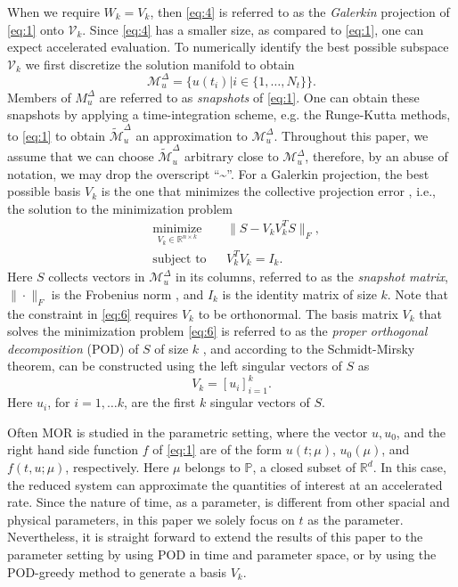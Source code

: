 When we require $W_k=V_k$, then \eqref{eq:4} is referred to as the \emph{Galerkin} projection of \eqref{eq:1} onto $\mathcal V_k$. Since \eqref{eq:4} has a smaller size, as compared to \eqref{eq:1}, one can expect accelerated evaluation. To numerically identify the best possible subspace $\mathcal V_{k}$ we first discretize the solution manifold to obtain
\begin{equation} \label{eq:5}
	\mathcal M_{u}^{\Delta} = \{ u(t_i) | i\in \{ 1,\dots,N_t \} \}.
\end{equation}
Members of $M_{u}^{\Delta}$ are referred to as \emph{snapshots} of \eqref{eq:1}. One can obtain these snapshots by applying a time-integration scheme, e.g. the Runge-Kutta methods, to \eqref{eq:1} to obtain $\tilde {\mathcal M}_{u}^{\Delta}$ an approximation to $\mathcal M_{u}^{\Delta}$. Throughout this paper, we assume that we can choose $\tilde{\mathcal M}_{u}^{\Delta}$ arbitrary close to $\mathcal M_{u}^{\Delta}$, therefore, by an abuse of notation, we may drop the overscript ``\textasciitilde''. For a Galerkin projection, the best possible basis $V_k$ is the one that minimizes the collective projection error \cite{hesthaven2015certified}, i.e., the solution to the minimization problem
\begin{equation} \label{eq:6}
\begin{aligned}
&  \underset{V_k\in\mathbb R^{n\times k}}{\text{minimize}}
& &  \| S - V_kV_k^TS\|_F, \\
& \text{subject to}
& & V_k^TV_k=I_k.
\end{aligned}
\end{equation}
Here $S$ collects vectors in $\mathcal M_{u}^{\Delta}$ in its columns, referred to as the \emph{snapshot matrix}, $\|\cdot \|_F$ is the Frobenius norm \cite{trefethen97}, and $I_{k}$ is the identity matrix of size $k$. Note that the constraint in \eqref{eq:6} requires $V_k$ to be orthonormal. The basis matrix $V_k$ that solves the minimization problem \eqref{eq:6} is referred to as the \emph{proper orthogonal decomposition} (POD) of $S$ of size $k$ \cite{hesthaven2015certified}, and according to the Schmidt-Mirsky theorem, can be constructed using the left singular vectors of $S$ as
\begin{equation}
	V_{k} = [u_i]_{i=1}^{k}.
\end{equation}
Here $u_i$, for $i=1,\dots k$, are the first $k$ singular vectors of $S$.

Often MOR is studied in the parametric setting, where the vector $u,u_0$, and the right hand side function $f$ of \eqref{eq:1} are of the form $u(t;\mu)$, $u_0(\mu)$, and $f(t,u;\mu)$, respectively. Here $\mu$ belongs to $\mathbb P$, a closed subset of $\mathbb R^d$. In this case, the reduced system can approximate the quantities of interest at an accelerated rate. Since the nature of time, as a parameter, is different from other spacial and physical parameters, in this paper we solely focus on $t$ as the parameter. Nevertheless, it is straight forward to extend the results of this paper to the parameter setting by using POD in time and parameter space, or by using the POD-greedy \cite{haasdonk2013convergence,hesthaven2015certified,quarteroni2015reduced} method to generate a basis $V_k$.

